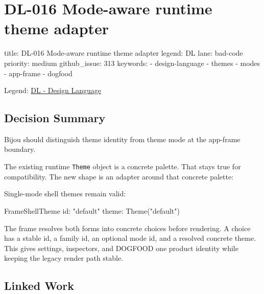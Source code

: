 \chapter{DL-016 Mode-aware runtime theme adapter}\label{record-181}

\smallskip

\begin{RecordMeta}
title: DL-016 Mode-aware runtime theme adapter
legend: DL
lane: bad-code
priority: medium
github_issue: 313
keywords:
  - design-language
  - themes
  - modes
  - app-frame
  - dogfood

\end{RecordMeta}

Legend: \href{https://github.com/flyingrobots/bijou/blob/1853ad902f6bf219326409e7f743a5a1d6517dbc/docs/legends/DL-design-language.md}{DL - Design Language}

\section{Decision Summary}\label{record-181-decision-summary}

Bijou should distinguish theme identity from theme mode at the app-frame boundary.

The existing runtime \texttt{T\allowbreak{}h\allowbreak{}e\allowbreak{}m\allowbreak{}e} object is a concrete palette. That stays true for compatibility. The new shape is an adapter around that concrete palette:



Single-mode shell themes remain valid:

\begin{CodeBlock}
FrameShellTheme
  id: "default"
  theme: Theme("default")
\end{CodeBlock}

The frame resolves both forms into concrete choices before rendering. A choice has a stable id, a family id, an optional mode id, and a resolved concrete theme. This gives settings, inspectors, and DOGFOOD one product identity while keeping the legacy render path stable.

\section{Linked Work}\label{record-181-linked-work}

